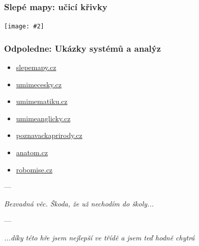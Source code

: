 \documentclass[bigger]{beamer}
\newcommand{\img}[2]{\begin{center}\texttt{[image: \#2]}\end{center}}
\begin{document}
\begin{frame}
  \frametitle{Slepé mapy: učicí křivky}

  \img{.95}{target_difficulty_context_learning_slope}
\end{frame}

\begin{frame}
   \frametitle{Odpoledne: Ukázky systémů a analýz}

   \begin{itemize}
   \item \url{slepemapy.cz}
   \item \url{umimecesky.cz}
   \item \url{umimematiku.cz}
   \item \url{umimeanglicky.cz}
   \item \url{poznavackaprirody.cz}
   \item \url{anatom.cz}
   \item \url{robomise.cz}
   \end{itemize}
---
\medskip

\emph{Bezvadná věc. Škoda, že už nechodím do školy...}

\medskip
---
\medskip

\emph{...díky této hře jsem nejlepší ve třídě a jsem teď hodně chytrá}

\end{frame}
\end{document}

